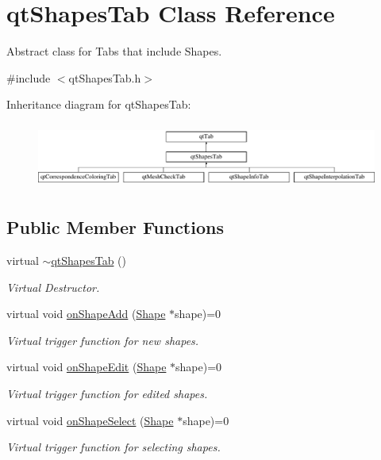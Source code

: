 \hypertarget{classqt_shapes_tab}{}\section{qt\+Shapes\+Tab Class Reference}
\label{classqt_shapes_tab}


Abstract class for Tabs that include Shapes.  




{\ttfamily \#include $<$qt\+Shapes\+Tab.\+h$>$}

Inheritance diagram for qt\+Shapes\+Tab\+:\begin{figure}[H]
\begin{center}
\leavevmode
\includegraphics[height=2.176166cm]{classqt_shapes_tab}
\end{center}
\end{figure}
\subsection*{Public Member Functions}
\begin{DoxyCompactItemize}
\item 
\hypertarget{classqt_shapes_tab_a592ecb3f59fb56e5c978aea874bd9f90}{}virtual \hyperlink{classqt_shapes_tab_a592ecb3f59fb56e5c978aea874bd9f90}{$\sim$qt\+Shapes\+Tab} ()\label{classqt_shapes_tab_a592ecb3f59fb56e5c978aea874bd9f90}

\begin{DoxyCompactList}\small\item\em Virtual Destructor. \end{DoxyCompactList}\item 
virtual void \hyperlink{classqt_shapes_tab_ac1785d1af606cd4ae0cd29708af7ae6f}{on\+Shape\+Add} (\hyperlink{class_shape}{Shape} $\ast$shape)=0
\begin{DoxyCompactList}\small\item\em Virtual trigger function for new shapes. \end{DoxyCompactList}\item 
virtual void \hyperlink{classqt_shapes_tab_a7e6ef278c299ef8934b6c1164b90574a}{on\+Shape\+Edit} (\hyperlink{class_shape}{Shape} $\ast$shape)=0
\begin{DoxyCompactList}\small\item\em Virtual trigger function for edited shapes. \end{DoxyCompactList}\item 
virtual void \hyperlink{classqt_shapes_tab_a50992777c7c5bcdf31adbb23e6bfb3a5}{on\+Shape\+Select} (\hyperlink{class_shape}{Shape} $\ast$shape)=0
\begin{DoxyCompactList}\small\item\em Virtual trigger function for selecting shapes. \end{DoxyCompactList}\end{DoxyCompactItemize}


